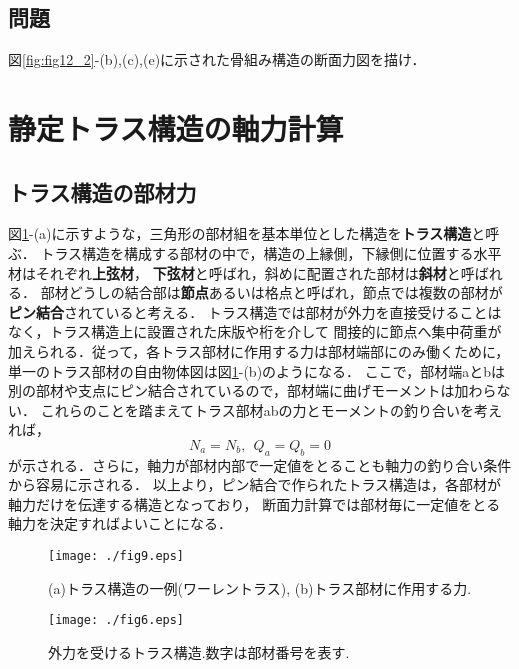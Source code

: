 ﻿\documentclass[10pt,a4j]{jbook}
\begin{document}
\subsection{問題}
図\ref{fig:fig12_2}-(b),(c),(e)に示された骨組み構造の断面力図を描け．
\section{静定トラス構造の軸力計算}
\subsection{トラス構造の部材力}
図\ref{fig:fig12_9}-(a)に示すような，三角形の部材組を基本単位とした構造を{\bf トラス構造}と呼ぶ．
トラス構造を構成する部材の中で，構造の上縁側，下縁側に位置する水平材はそれぞれ{\bf 上弦材}，
{\bf 下弦材}と呼ばれ，斜めに配置された部材は{\bf 斜材}と呼ばれる．
部材どうしの結合部は{\bf 節点}あるいは格点と呼ばれ，節点では複数の部材が{\bf ピン結合}されていると考える．
トラス構造では部材が外力を直接受けることはなく，トラス構造上に設置された床版や桁を介して
間接的に節点へ集中荷重が加えられる．従って，各トラス部材に作用する力は部材端部にのみ働くために，
単一のトラス部材の自由物体図は図\ref{fig:fig12_9}-(b)のようになる．
ここで，部材端aとbは別の部材や支点にピン結合されているので，部材端に曲げモーメントは加わらない．
これらのことを踏まえてトラス部材abの力とモーメントの釣り合いを考えれば，
\begin{equation}
	N_a=N_b, \ \ Q_a=Q_b=0
\end{equation}
が示される．さらに，軸力が部材内部で一定値をとることも軸力の釣り合い条件から容易に示される．
以上より，ピン結合で作られたトラス構造は，各部材が軸力だけを伝達する構造となっており，
断面力計算では部材毎に一定値をとる軸力を決定すればよいことになる．
\begin{figure}[h]
	\begin{center}
	\texttt{[image: ./fig9.eps]} 
	\end{center}
	\caption{
		(a)トラス構造の一例(ワーレントラス), (b)トラス部材に作用する力. 
	} 
	\label{fig:fig12_9}
\end{figure}
\begin{figure}[h]
	\begin{center}
	\texttt{[image: ./fig6.eps]} 
	\end{center}
	\caption{
		外力を受けるトラス構造.数字は部材番号を表す.
	} 
	\label{fig:fig12_6}
\end{figure}
\end{document}
